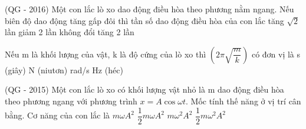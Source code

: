 
\begin{ex} %
(QG - 2016) Một con lắc lò xo dao động điều hòa theo phương nằm ngang. Nếu biên độ dao động tăng gấp đôi thì tần số dao động điều hòa của con lắc
\choice
{tăng $\sqrt{2}$ lần}
{giảm 2 lần}
{\True không đổi}
{tăng 2 lần}
\end{ex} 

\begin{ex} %
Nếu m là khối lượng của vật, k là độ cứng của lò xo thì $\left(2\pi\sqrt{\dfrac{m}{k}}\right)$ có đơn vị là
\choice
{\True s (giây)}
{N (niutơn)}
{rad/s}
{Hz (héc)}
\end{ex} 

 
\begin{ex} %
(QG - 2015) Một con lắc lò xo có khối lượng vật nhỏ là m dao động điều hòa theo phương ngang với phương trình $x = A\cos\omega t$. Mốc tính thế năng ở vị trí cân bằng. Cơ năng của con lắc là
\choice
{$m\omega A^2$}
{$\dfrac{1}{2}m\omega A^{2}$}
{$m\omega ^{2}A^{2}$}
{\True $\dfrac{1}{2}m\omega ^{2}A^{2}$}
\end{ex} 

